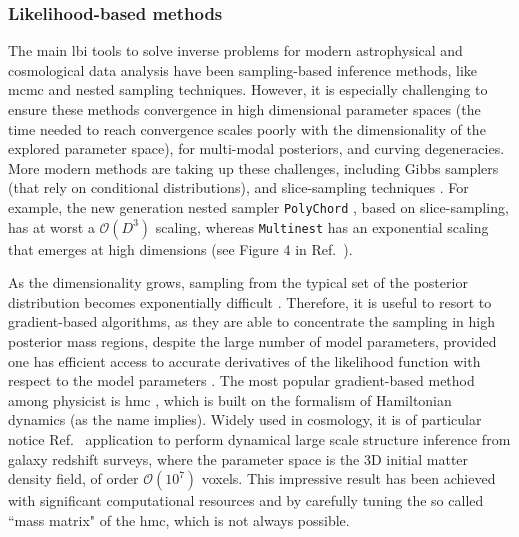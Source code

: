 \subsubsection{Likelihood-based methods}

The main \gls*{lbi} tools to solve inverse problems for modern astrophysical and cosmological data analysis have been sampling-based inference methods, like \gls*{mcmc} \citep{Metropolis:1953am, Hastings:1970aa} and nested sampling \citep{Skilling:2006gxv, Feroz:2008xx, Ashton:2022grj} techniques. However, it is especially challenging to ensure these methods convergence in high dimensional parameter spaces (the time needed to reach convergence scales poorly with the dimensionality of the explored parameter space), for multi-modal posteriors, and curving degeneracies. More modern methods are taking up these challenges, including Gibbs samplers \cite{Smith:1993gibbs} (that rely on conditional distributions), and slice-sampling techniques \cite{Neal:aa, Handley:2015fda}. For example, the new generation nested sampler \texttt{PolyChord} \cite{Handley:2015fda}, based on slice-sampling, has at worst a $\mathcal{O}(D^3)$ scaling, whereas \texttt{Multinest} \cite{Feroz:2008xx} has an exponential scaling that emerges at high dimensions (see Figure 4 in Ref.~\cite{Handley:2015fda}).

As the dimensionality grows, sampling from the typical set of the posterior distribution becomes exponentially difficult \cite{betancourt2017conceptual}. Therefore, it is useful to resort to gradient-based algorithms, as they are able to concentrate the sampling in high posterior mass regions, despite the large number of model parameters, provided one has efficient access to accurate derivatives of the likelihood function with respect to the model parameters \cite{betancourt2017conceptual}. The most popular gradient-based method among physicist is \gls*{hmc} \cite{Duane:1987hmc, neal2012mcmc}, which is built on the formalism of Hamiltonian dynamics (as the name implies). Widely used in cosmology, it is of particular notice Ref.~\cite{Jasche:2012kq} application to perform dynamical large scale structure inference from galaxy redshift surveys, where the parameter space is the 3D initial matter density field, of order $\mathcal{O}(10^7)$ voxels. This impressive result has been achieved with significant computational resources and by carefully tuning the so called ``mass matrix" of the \gls*{hmc}, which is not always possible. 

